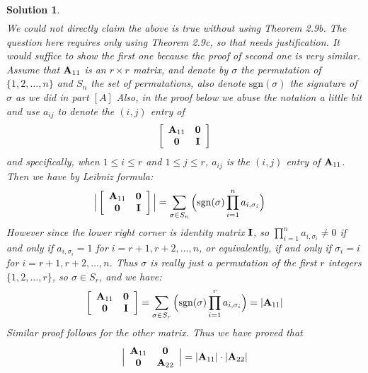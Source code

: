 \documentclass[11pt]{article}
\newtheorem{sol}{Solution}
\begin{document}
\begin{sol}
\begin{align*}
	\end{align*}
	We could not directly claim the above is true without using Theorem 2.9b. The question here requires only using Theorem 2.9c, so that needs justification.\vskip 2mm
	It would suffice to show the first one because the proof of second one is very similar.\vskip 2mm
	Assume that ${\bf A}_{11}$ is an $r \times r$ matrix, and denote by $\sigma$ the permutation of $\{1, 2, \ldots, n\}$ and $S_n$ the set of permutations, also denote $\text{sgn}(\sigma)$ the signature of $\sigma$ as we did in part $[A]$\vskip 2mm
	Also, in the proof below we abuse the notation a little bit and use $a_{ij}$ to denote the $(i, j)$ entry of 
	\begin{align*}
		\left[\begin{array}{cc} {\bf A}_{11}& {\bf 0}\\ {\bf 0}& {\bf I}\end{array}\right]
	\end{align*}
	and specifically, when $1 \leq i \leq r$ and $1 \leq j \leq r$, $a_{ij}$ is the $(i, j)$ entry of ${\bf A}_{11}$.
	Then we have by Leibniz formula:
	\begin{align*}
		 \Big|\left[\begin{array}{cc} {\bf A}_{11}& {\bf 0}\\ {\bf 0}& {\bf I}\end{array}\right]\Big| &= \sum_{\sigma \in S_n}\Big(\text{sgn}(\sigma)\prod_{i = 1}^n a_{i, \sigma_i}\Big)
	\end{align*}
	However since the lower right corner is identity matrix ${\bf I}$, so $\prod_{i = 1}^n a_{i, \sigma_i} \neq 0$ if and only if $a_{i, \sigma_i} = 1$ for $i = r + 1, r+2, \ldots, n$, or equivalently, if and only if $\sigma_{i} = i$ for $i = r+1, r+2, \ldots, n$. Thus $\sigma$ is really just a permutation of the first $r$ integers $\{1, 2, \ldots, r\}$, so $\sigma \in S_r$, and we have:
	\begin{align*}
		\left[\begin{array}{cc} {\bf A}_{11}& {\bf 0}\\ {\bf 0}& {\bf I}\end{array}\right] = \sum_{\sigma \in S_r}\Big(\text{sgn}(\sigma)\prod_{i = 1}^r a_{i, \sigma_i}\Big) = |{\bf A}_{11}|
	\end{align*}
	Similar proof follows for the other matrix. Thus we have proved that
	\begin{align*}
		\Big|\begin{array}{cc} {\bf A}_{11}& {\bf 0}\\ {\bf 0}& {\bf A}_{22}\end{array}\Big| = |{\bf A}_{11}|\cdot |{\bf A}_{22}|

\end{align*}
\end{sol}
\end{document}
